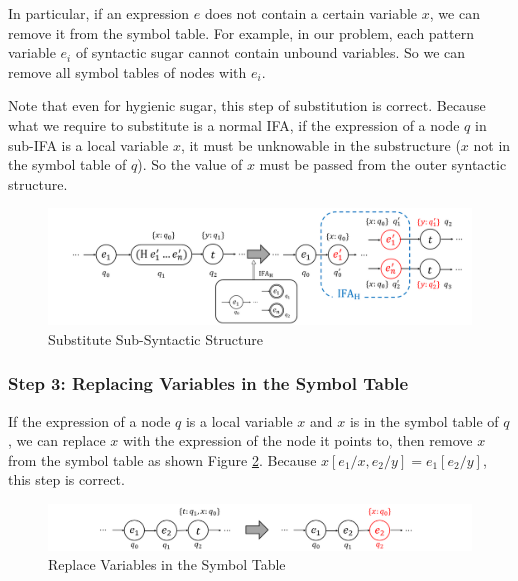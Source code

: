 In particular, if an expression $e$ does not contain a certain variable $x$, we can remove it from the symbol table. For example, in our problem, each pattern variable $e_i$ of syntactic sugar cannot contain unbound variables. So we can remove all symbol tables of nodes with $e_i$.

Note that even for hygienic sugar, this step of substitution is correct. Because what we require to substitute is a normal IFA, if the expression of a node $q$ in sub-IFA is a local variable $x$, it must be unknowable in the substructure ($x$ not in the symbol table of $q$). So the value of $x$ must be passed from the outer syntactic structure.

\begin{figure}[t]
    \centering
    \includegraphics[scale=0.25]{images/nmlifa/nmlifa-subst.png}
    \caption{Substitute Sub-Syntactic Structure}
    \label{fig:nmlifa-subst}
\end{figure}

\subsubsection*{Step 3: Replacing Variables in the Symbol Table}

If the expression of a node $q$ is a local variable $x$ and $x$ is in the symbol table of $q$, we can replace $x$ with the expression of the node it points to, then remove $x$ from the symbol table as shown Figure \ref{fig:nmlifa-replace}. Because $x[e_1/x, e_2/y]=e_1[e_2/y]$, this step is correct.

\begin{figure}[t]
    \centering
    \includegraphics[scale=0.25]{images/nmlifa/nmlifa-replace.png}
    \caption{Replace Variables in the Symbol Table}
    \label{fig:nmlifa-replace}
\end{figure}

